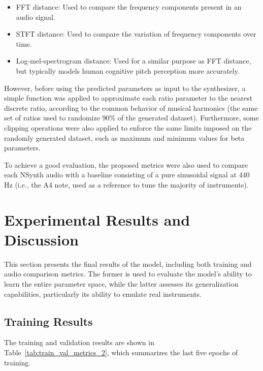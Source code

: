 \documentclass[10pt,conference]{IEEEtran}
\begin{document}
\begin{itemize}
    \item FFT distance: Used to compare the frequency components present in an audio signal.
    \item STFT distance: Used to compare the variation of frequency components over time.
    \item Log-mel-spectrogram distance: Used for a similar purpose as FFT distance, but typically models human cognitive pitch perception more accurately.
\end{itemize}

However, before using the predicted parameters as input to the synthesizer, a simple function was applied to approximate each ratio parameter to the nearest discrete ratio, according to the common behavior of musical harmonics (the same set of ratios used to randomize 90\% of the generated dataset). Furthermore, some clipping operations were also applied to enforce the same limits imposed on the randomly generated dataset, such as maximum and minimum values for beta parameters.

To achieve a good evaluation, the proposed metrics were also used to compare each NSynth audio with a baseline consisting of a pure sinusoidal signal at 440 Hz (i.e., the A4 note, used as a reference to tune the majority of instruments).

\section{Experimental Results and Discussion}  \label{sec:experiments}

This section presents the final results of the model, including both training and audio comparison metrics. The former is used to evaluate the model’s ability to learn the entire parameter space, while the latter assesses its generalization capabilities, particularly its ability to emulate real instruments.

\subsection{Training Results}

The training and validation results are shown in Table~\ref{tab:train_val_metrics_2}, which summarizes the last five epochs of training.
\end{document}
